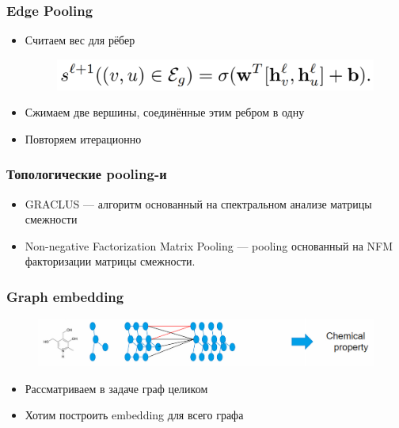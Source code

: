 \documentclass{beamer}
\begin{document}
\begin{frame}
\frametitle{Edge Pooling}
\begin{itemize}
	\item Считаем вес для рёбер
	\begin{figure}
		\includegraphics[width=0.7\columnwidth]{edge_pooling.png}
	\end{figure}
	\item Сжимаем две вершины, соединённые этим ребром в одну
	\item Повторяем итерационно
\end{itemize}
\end{frame}

\begin{frame}
\frametitle{Топологические pooling-и}
\begin{itemize}
	\item GRACLUS --- алгоритм основанный на спектральном анализе матрицы смежности
	\item Non-negative Factorization Matrix Pooling --- pooling основанный на NFM факторизации матрицы смежности.
\end{itemize}
\end{frame}

\begin{frame}
\frametitle{Graph embedding}
\begin{figure}
	\includegraphics[width=\columnwidth]{moleculs.png}
\end{figure}
\begin{itemize}
	\item Рассматриваем в задаче граф целиком
	\item Хотим построить embedding для всего графа
\end{itemize}
\end{frame}
\end{document}
